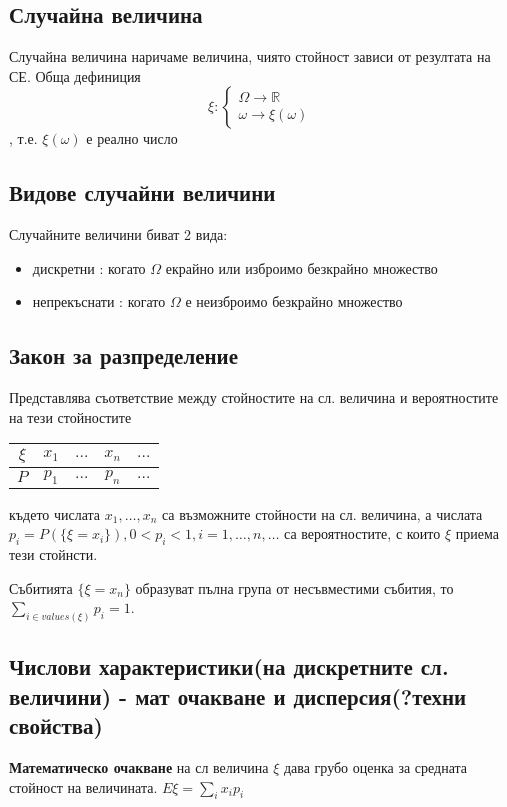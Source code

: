 \documentclass[fleqn,12pt]{article}
\begin{document}
\begin{justify}
\subsection{Случайна величина}
Случайна величина наричаме величина, чиято стойност зависи от резултата на СЕ. Обща дефиниция
\[\xi : \begin{cases}
    \Omega \rightarrow \mathbb{R}\\
    \omega \rightarrow \xi(\omega)
\end{cases} \], т.е. $\xi(\omega)$ е реално число
\subsection{Видове случайни величини}
Случайните величини биват 2 вида:
\begin{itemize}
    \item дискретни : когато $\Omega$ екрайно или изброимо безкрайно множество
    \item непрекъснати : когато $\Omega$ е неизброимо безкрайно множество
\end{itemize}
\subsection{Закон за разпределение}
Представлява съответствие между стойностите на сл. величина и вероятностите на тези стойностите

\begin{tabular}{|c|c|c|c|c|}
    \hline
    $\xi$ & $x_1$ & $\dots$ & $x_n$ & $\dots$ \\
    \hline
    $P$ & $p_1$ & $\dots$ & $p_n$ & $\dots$ \\
    \hline
\end{tabular}

където числата $x_1,\dots,x_n$ са възможните стойности на сл. величина, а числата 
$p_i=P(\{\xi = x_i\}), 0 < p_i < 1, i=1,\dots,n,\dots$ са вероятностите, с които $\xi$ приема тези стойнсти. 

Събитията $\{\xi = x_n\}$ образуват пълна група от несъвместими събития, то $\sum_{i \in values(\xi)} p_i = 1$.

\subsection{Числови характеристики(на дискретните сл. величини) - мат очакване и дисперсия(?техни свойства)}
\textbf{Математическо очакване} на сл величина $\xi$ дава грубо оценка за средната стойност на величината.
$E\xi = \sum_i x_i p_i$


\end{justify}
\end{document}
